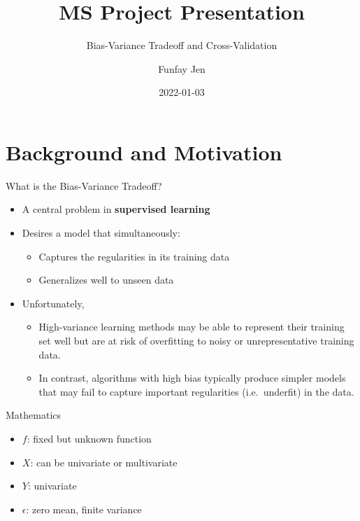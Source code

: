 \documentclass[
  ignorenonframetext,
]{beamer}
\title{MS Project Presentation}
\subtitle{Bias-Variance Tradeoff and Cross-Validation}
\author{Funfay Jen}
\date{2022-01-03}
\providecommand{\tightlist}{%
  \setlength{\itemsep}{0pt}\setlength{\parskip}{0pt}}
\begin{document}
\frame{\titlepage}

\begin{frame}[allowframebreaks]
  \tableofcontents[hideallsubsections]
\end{frame}
\hypertarget{background-and-motivation}{%
\section{Background and Motivation}\label{background-and-motivation}}

\begin{frame}{What is the Bias-Variance Tradeoff?}
\protect\hypertarget{what-is-the-bias-variance-tradeoff}{}
\begin{itemize}
\tightlist
\item
  A central problem in \textbf{supervised learning}
\item
  Desires a model that simultaneously:

  \begin{itemize}
  \tightlist
  \item
    Captures the regularities in its training data
  \item
    Generalizes well to unseen data
  \end{itemize}
\item
  Unfortunately,

  \begin{itemize}
  \tightlist
  \item
    High-variance learning methods may be able to represent their training set well but are at risk of overfitting to noisy or unrepresentative training data.
  \item
    In contrast, algorithms with high bias typically produce simpler models that may fail to capture important regularities (i.e.~underfit) in the data.
  \end{itemize}
\end{itemize}
\end{frame}

\begin{frame}{Mathematics}
\protect\hypertarget{mathematics}{}
\begin{itemize}
\tightlist
\item
  \(f\): fixed but unknown function
\item
  \(X\): can be univariate or multivariate
\item
  \(Y\): univariate
\item
  \(\epsilon\): zero mean, finite variance
\end{itemize}
\end{frame}
\end{document}
